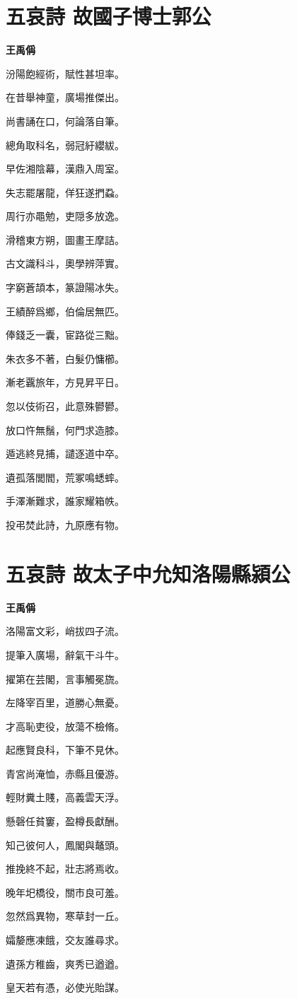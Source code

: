 \documentclass[12pt,a4paper]{ctexbook}
\begin{document}
\section{五哀詩 故國子博士郭公}
\textbf{王禹偁}\par\vspace{0.5em}
汾陽飽經術，賦性甚坦率。\par
在昔舉神童，廣場推傑出。\par
尚書誦在口，何論落自筆。\par
總角取科名，弱冠紆纓紱。\par
早佐湘陰幕，漢鼎入周室。\par
失志罷屠龍，佯狂遂捫蝨。\par
周行亦黽勉，吏隠多放逸。\par
滑稽東方朔，圖畫王摩詰。\par
古文識科斗，奧學辨萍實。\par
字窮蒼頡本，篆證陽冰失。\par
王績醉爲鄉，伯倫居無匹。\par
俸錢乏一囊，宦路從三黜。\par
朱衣多不著，白髮仍慵櫛。\par
漸老覊旅年，方見昇平日。\par
忽以伎術召，此意殊鬰鬰。\par
放口忤無鬚，何門求造膝。\par
遁逃終見捕，譴逐道中卒。\par
遺孤落閭閻，荒冢鳴蟋蟀。\par
手澤漸難求，誰家耀箱帙。\par
投弔焚此詩，九原應有物。\par

\section{五哀詩 故太子中允知洛陽縣潁公}
\textbf{王禹偁}\par\vspace{0.5em}
洛陽富文彩，峭拔四子流。\par
提筆入廣場，辭氣干斗牛。\par
擢第在芸閣，言事觸冕旒。\par
左降宰百里，道勝心無憂。\par
才高恥吏役，放蕩不檢脩。\par
起應賢良科，下筆不見休。\par
青宮尚淹恤，赤縣且優游。\par
輕財糞土賤，高義雲天浮。\par
懸磬任貧窶，盈樽長獻酬。\par
知己彼何人，鳳閣與鼇頭。\par
推挽終不起，壯志將焉收。\par
晚年圯橋役，關市良可羞。\par
忽然爲異物，寒草封一丘。\par
孀嫠應凍餓，交友誰尋求。\par
遺孫方稚齒，爽秀已遒遒。\par
皇天若有憑，必使光貽謀。\par
\end{document}
